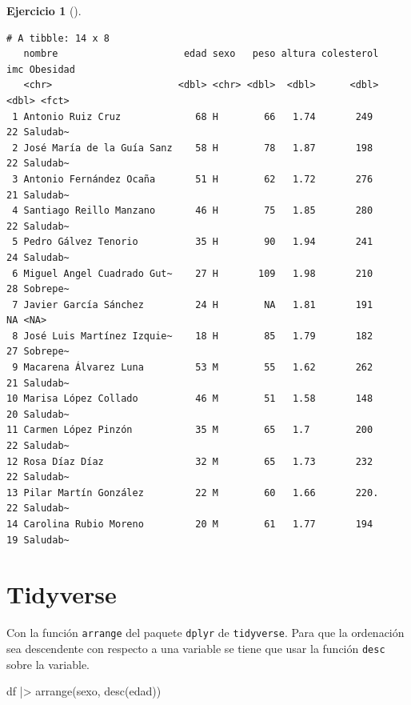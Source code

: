 \documentclass[
  a4paper,
]{scrreport}
\newenvironment{Shaded}{\begin{snugshade}}{\end{snugshade}}
\newcommand{\FunctionTok}[1]{\textcolor[rgb]{0.28,0.35,0.67}{#1}}
\newcommand{\NormalTok}[1]{\textcolor[rgb]{0.00,0.23,0.31}{#1}}
\newcommand{\SpecialCharTok}[1]{\textcolor[rgb]{0.37,0.37,0.37}{#1}}
\theoremstyle{definition}
\newtheorem{exercise}{Ejercicio}[chapter]
\theoremstyle{remark}
\begin{document}
\begin{exercise}[]
\begin{enumerate}
\begin{tcolorbox}
\begin{verbatim}
# A tibble: 14 x 8
   nombre                      edad sexo   peso altura colesterol   imc Obesidad
   <chr>                      <dbl> <chr> <dbl>  <dbl>      <dbl> <dbl> <fct>   
 1 Antonio Ruiz Cruz             68 H        66   1.74       249     22 Saludab~
 2 José María de la Guía Sanz    58 H        78   1.87       198     22 Saludab~
 3 Antonio Fernández Ocaña       51 H        62   1.72       276     21 Saludab~
 4 Santiago Reillo Manzano       46 H        75   1.85       280     22 Saludab~
 5 Pedro Gálvez Tenorio          35 H        90   1.94       241     24 Saludab~
 6 Miguel Angel Cuadrado Gut~    27 H       109   1.98       210     28 Sobrepe~
 7 Javier García Sánchez         24 H        NA   1.81       191     NA <NA>    
 8 José Luis Martínez Izquie~    18 H        85   1.79       182     27 Sobrepe~
 9 Macarena Álvarez Luna         53 M        55   1.62       262     21 Saludab~
10 Marisa López Collado          46 M        51   1.58       148     20 Saludab~
11 Carmen López Pinzón           35 M        65   1.7        200     22 Saludab~
12 Rosa Díaz Díaz                32 M        65   1.73       232     22 Saludab~
13 Pilar Martín González         22 M        60   1.66       220.    22 Saludab~
14 Carolina Rubio Moreno         20 M        61   1.77       194     19 Saludab~
\end{verbatim}

  \section{Tidyverse}

  Con la función \texttt{arrange} del paquete \texttt{dplyr} de
  \texttt{tidyverse}. Para que la ordenación sea descendente con
  respecto a una variable se tiene que usar la función \texttt{desc}
  sobre la variable.

\begin{Shaded}
\begin{Highlighting}[]
\NormalTok{df }\SpecialCharTok{|\textgreater{}}
    \FunctionTok{arrange}\NormalTok{(sexo, }\FunctionTok{desc}\NormalTok{(edad))}
\end{Highlighting}
\end{Shaded}


\end{tcolorbox}
\end{enumerate}
\end{exercise}
\end{document}
